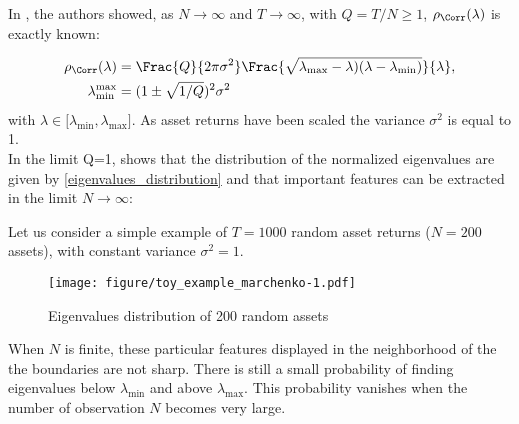In \cite{Edelman1988}, the authors showed, as $N \to \infty$ and $T \to \infty$, with $Q = T/N \geq 1$, $\rho_{\Corr}(\lambda)$ is exactly known:

\begin{align}
\label{eigenvalues_distribution}
  \rho_{\Corr}(\lambda) &= \Frac{Q}{2\pi\sigma^2} \Frac{\sqrt{\lambda_{\text{max}} - \lambda) (\lambda - \lambda_{\text{min}})}}{\lambda}, \\
  \lambda^{{\text{max}}}_{\text{min}} &= (1 \pm \sqrt{1/Q})^2 \sigma^2
\end{align}
with $\lambda \in \lbrack \lambda_{\text{min}}, \lambda_{\text{max}}\rbrack$. As asset returns have been scaled the variance $\sigma^2$ is equal to 1. \\

In the limit Q=1, \cite{Laloux1999} shows that the distribution of the normalized eigenvalues are given by \eqref{eigenvalues_distribution} and that important features can be extracted in the limit $N \to \infty$:

\begin{examp}
Let us consider a simple example of $T=1000$ random asset returns ($N = 200$ assets), with constant variance $\sigma^2=1$. 
\end{examp}
\begin{figure}[!ht]
  \centering
  \texttt{[image: figure/toy\_example\_marchenko-1.pdf]}
  \caption{Eigenvalues distribution of 200 random assets}
  \label{fig:toy_example_marchenko-1}
\end{figure}

When $N$ is finite, these particular features displayed in the neighborhood of the the boundaries are not sharp. There is still a small probability of finding eigenvalues below $\lambda_{}$ and above $\lambda_{}$. This probability vanishes when the number of observation $N$ becomes very large. 



